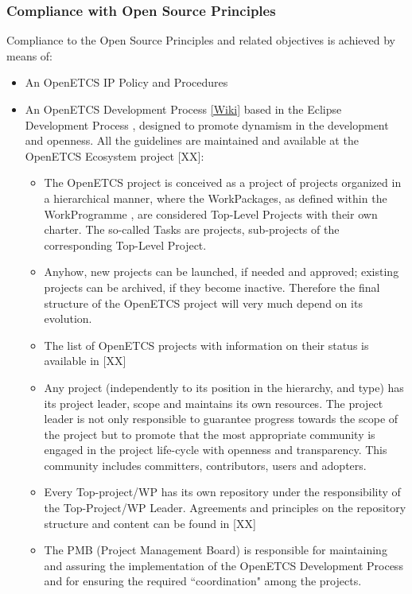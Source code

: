 \documentclass{template/openetcs_article}
\begin{document}
\subsubsection{Compliance with Open Source Principles}
Compliance to the Open Source Principles and related objectives is achieved by means of:
\begin{itemize}
\item An OpenETCS \gls{IP} Policy and Procedures \citep{IPP}
\item An OpenETCS Development Process \citep{odp} \href{https://github.com/openETCS/ecosystem/wiki/openETCS-Development-Process}{[Wiki]} based in the Eclipse Development Process \citep{EDP}, designed to promote dynamism in the development and openness. All the guidelines are maintained and available at the OpenETCS Ecosystem project [XX]: 
\begin{itemize}
\item The OpenETCS project is conceived as a project of projects organized in a hierarchical manner, where the WorkPackages, as defined within the WorkProgramme \citep{fpp}, are considered Top-Level Projects with their own charter. The so-called Tasks are projects, sub-projects of the corresponding Top-Level Project.
\item Anyhow, new projects can be launched, if needed and approved; existing projects can be archived, if they become inactive. Therefore the final structure of the OpenETCS project will very much depend on its evolution.  
\item The list of OpenETCS projects with information on their status is available in [XX]
\item Any project (independently to its position in the hierarchy, and type) has its project leader, scope and maintains its own resources. The project leader is not only responsible to guarantee progress towards the scope of the project but to promote that the most appropriate community is engaged in the project life-cycle with openness and transparency. This community includes committers, contributors, users and adopters.
\item Every Top-project/\gls{WP} has its own repository under the responsibility of the Top-Project/\gls{WP} Leader. Agreements and principles on the repository structure and content can be found in [XX] 
\item The PMB (Project Management Board) is responsible for maintaining and assuring the implementation of the OpenETCS Development Process and for ensuring the required “coordination" among the projects.

\end{itemize}
\end{itemize}
\end{document}
